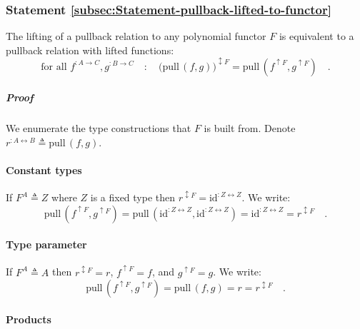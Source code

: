 \subsubsection{Statement \label{subsec:Statement-pullback-lifted-to-functor}\ref{subsec:Statement-pullback-lifted-to-functor}}

The lifting of a pullback relation to any polynomial functor $F$
is equivalent to a pullback relation with lifted functions:
\[
\text{for all }f^{:A\rightarrow C},g^{:B\rightarrow C}\quad:\quad\big(\text{pull}\,(f,g)\big)^{\updownarrow F}=\text{pull}\,(f^{\uparrow F},g^{\uparrow F})\quad.
\]


\subparagraph{Proof}

\begin{comment}
Most likely this is wrong for non-polynomial (although covariant)
functors $F$
\end{comment}
We enumerate the type constructions that $F$ is built from. Denote
$r^{:A\leftrightarrow B}\triangleq\text{pull}\,(f,g)$.

\paragraph{Constant types}

If $F^{A}\triangleq Z$ where $Z$ is a fixed type then $r^{\updownarrow F}=\text{id}^{:Z\leftrightarrow Z}$.
We write:
\[
\text{pull}\,(f^{\uparrow F},g^{\uparrow F})=\text{pull}\,(\text{id}^{:Z\leftrightarrow Z},\text{id}^{:Z\leftrightarrow Z})=\text{id}^{:Z\leftrightarrow Z}=r^{\updownarrow F}\quad.
\]


\paragraph{Type parameter}

If $F^{A}\triangleq A$ then $r^{\updownarrow F}=r$, $f^{\uparrow F}=f$,
and $g^{\uparrow F}=g$. We write:
\[
\text{pull}\,(f^{\uparrow F},g^{\uparrow F})=\text{pull}\,(f,g)=r=r^{\updownarrow F}\quad.
\]


\paragraph{Products}

